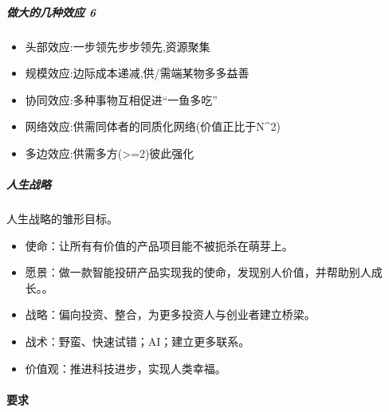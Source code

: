 \documentclass[letterpaper,10pt,english]{sphinxmanual}
\begin{document}
\subparagraph{做大的几种效应 6\sphinxfootnotemark[835]}
\label{\detokenize{chapter_interview/choose:id8}}%
\begin{footnotetext}[835]\sphinxAtStartFootnote
{}
%
\end{footnotetext}\ignorespaces \begin{itemize}
\item {} 
头部效应:一步领先步步领先,资源聚集

\item {} 
规模效应:边际成本递减,供/需端某物多多益善

\item {} 
协同效应:多种事物互相促进“一鱼多吃”

\item {} 
网络效应:供需同体者的同质化网络(价值正比于N\textasciicircum{}2)

\item {} 
多边效应:供需多方(>=2)彼此强化

\end{itemize}


\subparagraph{人生战略}
\label{\detokenize{chapter_interview/choose:id9}}
人生战略的雏形目标。%
\begin{footnote}[836]\sphinxAtStartFootnote
{}
%
\end{footnote}
\begin{itemize}
\item {} 
使命：让所有有价值的产品项目能不被扼杀在萌芽上。

\item {} 
愿景：做一款智能投研产品实现我的使命，发现别人价值，并帮助别人成长。。

\item {} 
战略：偏向投资、整合，为更多投资人与创业者建立桥梁。

\item {} 
战术：野蛮、快速试错；AI；建立更多联系。

\item {} 
价值观：推进科技进步，实现人类幸福。

\end{itemize}


\paragraph{要求}
\label{\detokenize{chapter_interview/require:id1}}\label{\detokenize{chapter_interview/require::doc}}
\end{document}
